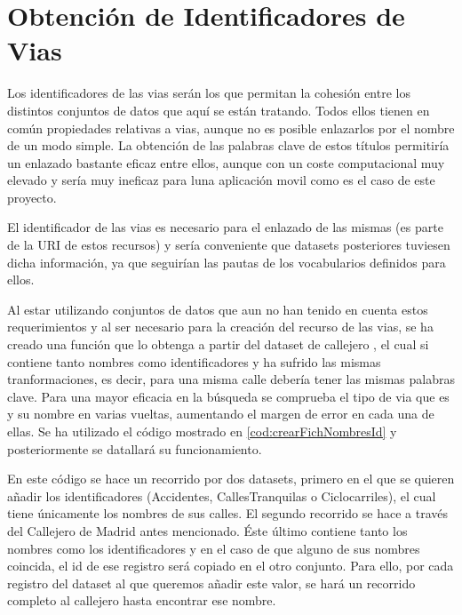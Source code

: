 \section{Obtención de Identificadores de Vias}

Los identificadores de las vias serán los que permitan la cohesión entre los distintos conjuntos de datos que aquí se están tratando. Todos ellos tienen en común propiedades relativas a vias, aunque no es posible enlazarlos por el nombre de un modo simple.
La obtención de las palabras clave de estos títulos permitiría un enlazado bastante eficaz entre ellos, aunque con un coste computacional muy elevado y sería muy ineficaz para luna aplicación movil como es el caso de este proyecto.

El identificador de las vias es necesario para el enlazado de las mismas (es parte de la URI de estos recursos) y sería conveniente que datasets posteriores tuviesen dicha información, ya que seguirían las pautas de los vocabularios definidos para ellos.

Al estar utilizando conjuntos de datos que aun no han tenido en cuenta estos requerimientos y al ser necesario para la creación del recurso de las vias, se ha creado una función que lo obtenga a partir del dataset de callejero \cite{datosmadrid_callejero}, el cual si contiene tanto nombres como identificadores y ha sufrido las mismas tranformaciones, es decir, para una misma calle debería tener las mismas palabras clave. Para una mayor eficacia en la búsqueda se comprueba el tipo de via que es y su nombre en varias vueltas, aumentando el margen de error en cada una de ellas.
Se ha utilizado el código mostrado en \ref{cod:crearFichNombresId} y posteriormente se datallará su funcionamiento.



En este código se hace un recorrido por dos datasets, primero en el que se quieren añadir los identificadores (Accidentes, CallesTranquilas o Ciclocarriles), el cual tiene únicamente los nombres de sus calles. El segundo recorrido se hace a través del Callejero de Madrid antes mencionado. Éste último contiene tanto los nombres como los identificadores y en el caso de que alguno de sus nombres coincida, el id de ese registro será copiado en el otro conjunto. Para ello, por cada registro del dataset al que queremos añadir este valor, se hará un recorrido completo al callejero hasta encontrar ese nombre.

